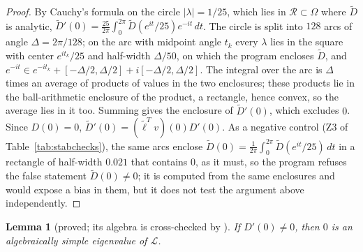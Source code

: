 \documentclass[11pt]{article}
\newtheorem{lemma}{Lemma}[section]
\theoremstyle{definition}
\newcommand{\Lop}{\mathcal{L}}
\newcommand{\Rbox}{\mathcal{R}}
\begin{document}
\begin{proof}
By Cauchy's formula on the circle $|\lambda| = 1/25$, which lies in $\Rbox \subset \Omega$ where $\tilde D$ is analytic, $\tilde D'(0) = \frac{25}{2\pi}\int_0^{2\pi}\tilde D(e^{it}/25)e^{-it}\, dt$. The circle is split into $128$ arcs of angle $\Delta = 2\pi/128$; on the arc with midpoint angle $t_k$ every $\lambda$ lies in the square with center $e^{it_k}/25$ and half-width $\Delta/50$, on which the program encloses $\tilde D$, and $e^{-it} \in e^{-it_k} + [-\Delta/2, \Delta/2] + i[-\Delta/2, \Delta/2]$. The integral over the arc is $\Delta$ times an average of products of values in the two enclosures; these products lie in the ball-arithmetic enclosure of the product, a rectangle, hence convex, so the average lies in it too. Summing gives the enclosure of $\tilde D'(0)$, which excludes $0$. Since $D(0) = 0$, $\tilde D'(0) = (\tilde\ell^Tv)(0)D'(0)$. As a negative control (Z3 of Table~\ref{tab:stabchecks}), the same arcs enclose $\tilde D(0) = \frac{1}{2\pi}\int_0^{2\pi}\tilde D(e^{it}/25)\, dt$ in a rectangle of half-width $0.021$ that contains $0$, as it must, so the program refuses the false statement $\tilde D(0) \ne 0$; it is computed from the same enclosures and would expose a bias in them, but it does not test the argument above independently.
\end{proof}

\begin{lemma}[proved; its algebra is cross-checked by ]\label{lem:multiplicity}
If $D'(0) \ne 0$, then $0$ is an algebraically simple eigenvalue of $\Lop$.
\end{lemma}
\end{document}
